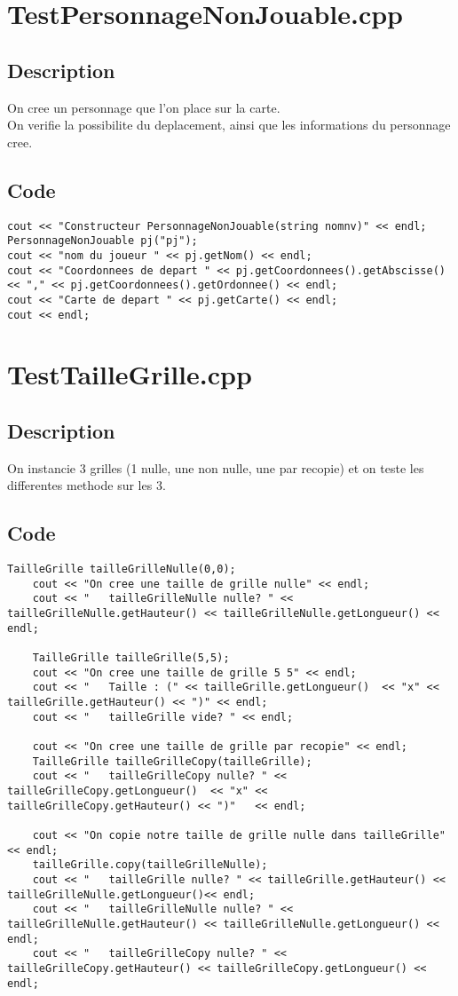     \section{TestPersonnageNonJouable.cpp}
        \subsection{Description}
            On cree un personnage que l'on place sur la carte.\\
            On verifie la possibilite du deplacement, ainsi que les informations du personnage cree.
        \subsection{Code}
\begin{lstlisting}	
cout << "Constructeur PersonnageNonJouable(string nomnv)" << endl;
PersonnageNonJouable pj("pj");
cout << "nom du joueur " << pj.getNom() << endl;
cout << "Coordonnees de depart " << pj.getCoordonnees().getAbscisse() << "," << pj.getCoordonnees().getOrdonnee() << endl;
cout << "Carte de depart " << pj.getCarte() << endl;
cout << endl;
	\end{lstlisting}
    \section{TestTailleGrille.cpp}
        \subsection{Description}
            On instancie 3 grilles (1 nulle, une non nulle, une par recopie) et on teste les differentes methode sur les 3.
        \subsection{Code}
\begin{lstlisting}
TailleGrille tailleGrilleNulle(0,0);
    cout << "On cree une taille de grille nulle" << endl;
    cout << "   tailleGrilleNulle nulle? " << tailleGrilleNulle.getHauteur() << tailleGrilleNulle.getLongueur() << endl;

    TailleGrille tailleGrille(5,5);
    cout << "On cree une taille de grille 5 5" << endl;
    cout << "   Taille : (" << tailleGrille.getLongueur()  << "x" << tailleGrille.getHauteur() << ")" << endl;
    cout << "   tailleGrille vide? " << endl;

    cout << "On cree une taille de grille par recopie" << endl;
    TailleGrille tailleGrilleCopy(tailleGrille);
    cout << "   tailleGrilleCopy nulle? " << tailleGrilleCopy.getLongueur()  << "x" << tailleGrilleCopy.getHauteur() << ")"   << endl;

    cout << "On copie notre taille de grille nulle dans tailleGrille" << endl;
    tailleGrille.copy(tailleGrilleNulle);
    cout << "   tailleGrille nulle? " << tailleGrille.getHauteur() << tailleGrilleNulle.getLongueur()<< endl;
    cout << "   tailleGrilleNulle nulle? " << tailleGrilleNulle.getHauteur() << tailleGrilleNulle.getLongueur() << endl;
    cout << "   tailleGrilleCopy nulle? " << tailleGrilleCopy.getHauteur() << tailleGrilleCopy.getLongueur() << endl;
	\end{lstlisting}
